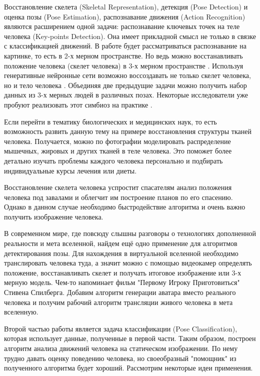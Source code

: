 Восстановление скелета (Skeletal Representation), детекция (Pose De\-te\-ction) и оценка позы (Pose Estimation), распознавание движения (Action Recognition) являются расширением одной задачи: распознавание ключевых точек на теле человека (Key-points Detection). Она имеет прикладной смысл не только в связке с классификацией движений. В работе  будет рассматриваться распознавание на картинке, то есть в 2-х мерном пространстве. Но ведь можно восстанавливать положение человека (скелет человека) в 3-х мерном пространстве \cite{WANG2021103225, 8100086}. Используя генеративные нейронные сети возможно воссоздавать не только скелет человека, но и тело человека \cite{Zhang_2017_CVPR}. Объединяя две предыдущие задачи можно получить набор данных из 3-х мерных людей в различных позах. Некоторые исследователи уже пробуют реализовать этот симбиоз на практике \cite{varol17_surreal}.

Если перейти в тематику биологических и медицинских наук, то есть возможность развить данную тему на примере восстановления структуры тканей человека. Получается, можно по фотографии моделировать распределение мышечных, жировых и других тканей в теле человека. Это поможет более детально изучать проблемы каждого человека персонально и подбирать индивидуальные курсы лечения или диеты.

Восстановление скелета человека успростит спасателям анализ положения человека под завалами и облегчит им построение планов по его спасению. Однако в данном случае необходимо быстродействие алгоритма и очень важно получить изображение человека.

В современном мире, где повсюду слышны разговоры о технологиях дополненной реальности и мета вселенной, найдем ещё одно применение для алгоритмов детектирования позы. Для нахождения в виртуальной вселенной необходимо транслировать человека туда, а значит можно с помощью видеокамер определять положение, восстанавливать скелет и получать итоговое изображение или 3-х мерную модель. Чем-то напоминает фильм "Первому Игроку Приготовиться"{} Стивена Спилберга. Добавим алгоритм генерации аватара вместо реального человека и получим рабочий алгоритм трансляции живого человека в мета вселенную.

\hfill \break
Второй частью работы является задача классификации (Pose Classi\-fi\-ca\-tion), которая использует данные, полученные в первой части. Таким образом, построен алгоритм анализа движений человека на статическом изображении. По нему трудно давать оценку поведению человека, но своеобразный "помощник"{} из полученного алгоритма будет хороший. Рассмотрим некоторые идеи применения.

